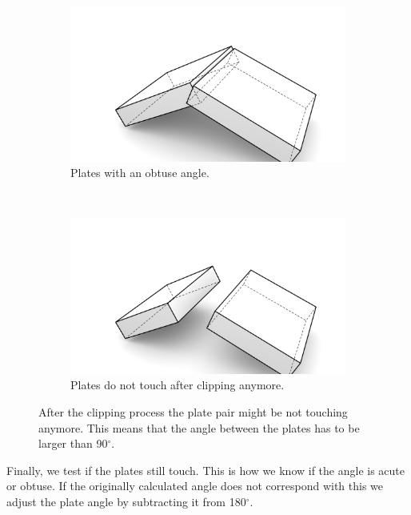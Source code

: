 \documentclass[../ClassicThesis.tex]{subfiles}
\begin{document}
\begin{figure}[!ht]
\begin{subfigure}[b]{0.45\textwidth}
\includegraphics[width=\columnwidth]{Images/Blocks_ovtuse_intersect(1).png}
\caption{Plates with an obtuse angle.}
\end{subfigure}
~
\begin{subfigure}[b]{0.45\textwidth}
\includegraphics[width=\columnwidth]{Images/Blocks_ovtuse_shortened(1).png}
\caption{Plates do not touch after clipping anymore.}
\end{subfigure}
\caption{After the clipping process the plate pair might be not touching anymore. This means that the angle between the plates has to be larger than 90$^\circ$.}
\label{fig:touchingOrNot}
\end{figure}

Finally, we test if the plates still touch. This is how we know if the angle is acute or obtuse. If the originally calculated angle does not correspond with this we adjust the plate angle by subtracting it from 180$^\circ$.
\end{document}

